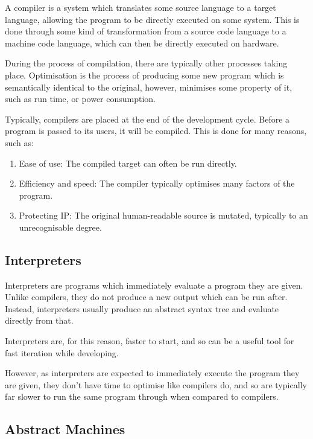 A compiler is a system which translates some source language to a target language, allowing the program to be directly executed on some system. This is done through some kind of transformation from a source code language to a machine code language, which can then be directly executed on hardware. 

During the process of compilation, there are typically other processes taking place. Optimisation is the process of producing some new program which is semantically identical to the original, however, minimises some property of it, such as run time, or power consumption.

Typically, compilers are placed at the end of the development cycle. Before a program is passed to its users, it will be compiled. This is done for many reasons, such as:
\begin{enumerate}
    \item Ease of use: The compiled target can often be run directly.
    \item Efficiency and speed: The compiler typically optimises many factors of the program.
    \item Protecting IP: The original human-readable source is mutated, typically to an unrecognisable degree.
\end{enumerate}


\subsection{Interpreters}

Interpreters are programs which immediately evaluate a program they are given. Unlike compilers, they do not produce a new output which can be run after. Instead, interpreters usually produce an abstract syntax tree and evaluate directly from that.

Interpreters are, for this reason, faster to start, and so can be a useful tool for fast iteration while developing. 

However, as interpreters are expected to immediately execute the program they are given, they don't have time to optimise like compilers do, and so are typically far slower to run the same program through when compared to compilers.

\subsection{Abstract Machines}

